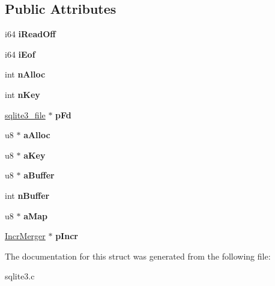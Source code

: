 \subsection*{Public Attributes}
\begin{DoxyCompactItemize}
\item 
i64 {\bfseries i\+Read\+Off}\hypertarget{structPmaReader_a04a9b631060dcda1d94eb7b16ef8920e}{}\label{structPmaReader_a04a9b631060dcda1d94eb7b16ef8920e}

\item 
i64 {\bfseries i\+Eof}\hypertarget{structPmaReader_a7a2e2745d054cd6d86e1ad57d641b657}{}\label{structPmaReader_a7a2e2745d054cd6d86e1ad57d641b657}

\item 
int {\bfseries n\+Alloc}\hypertarget{structPmaReader_a82522a9128afb8bfb79b88a7c51726ef}{}\label{structPmaReader_a82522a9128afb8bfb79b88a7c51726ef}

\item 
int {\bfseries n\+Key}\hypertarget{structPmaReader_a02c5dbf65efa252a84259b1ee2a7cd3c}{}\label{structPmaReader_a02c5dbf65efa252a84259b1ee2a7cd3c}

\item 
\hyperlink{structsqlite3__file}{sqlite3\+\_\+file} $\ast$ {\bfseries p\+Fd}\hypertarget{structPmaReader_a1ae1caa6e4b1900937135aeeaf1336cd}{}\label{structPmaReader_a1ae1caa6e4b1900937135aeeaf1336cd}

\item 
u8 $\ast$ {\bfseries a\+Alloc}\hypertarget{structPmaReader_af8d5ac60d1ba7ff84e84d5eb6aba4447}{}\label{structPmaReader_af8d5ac60d1ba7ff84e84d5eb6aba4447}

\item 
u8 $\ast$ {\bfseries a\+Key}\hypertarget{structPmaReader_af8f5dbc63cbbcbf9ee4c2c462ab1c6ff}{}\label{structPmaReader_af8f5dbc63cbbcbf9ee4c2c462ab1c6ff}

\item 
u8 $\ast$ {\bfseries a\+Buffer}\hypertarget{structPmaReader_acd2a7f3e0375a3f8dfa9e565d080e2c2}{}\label{structPmaReader_acd2a7f3e0375a3f8dfa9e565d080e2c2}

\item 
int {\bfseries n\+Buffer}\hypertarget{structPmaReader_a422d021b0509c7e5eb2938bba36a5cdd}{}\label{structPmaReader_a422d021b0509c7e5eb2938bba36a5cdd}

\item 
u8 $\ast$ {\bfseries a\+Map}\hypertarget{structPmaReader_ad90dc0ec0c900dd21377c146ac73c73f}{}\label{structPmaReader_ad90dc0ec0c900dd21377c146ac73c73f}

\item 
\hyperlink{structIncrMerger}{Incr\+Merger} $\ast$ {\bfseries p\+Incr}\hypertarget{structPmaReader_a34569bea49de8122239eb40eaae8b10f}{}\label{structPmaReader_a34569bea49de8122239eb40eaae8b10f}

\end{DoxyCompactItemize}


The documentation for this struct was generated from the following file\+:\begin{DoxyCompactItemize}
\item 
sqlite3.\+c\end{DoxyCompactItemize}
